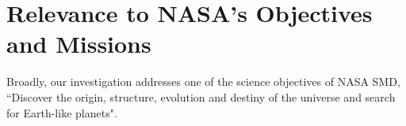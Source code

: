 \documentclass[12pt]{article}
\def\minerva{MINERVA}
\def\hrs{HET/HRS}
\begin{document}

 
\vspace{-3pt}
\section{Relevance to NASA's Objectives and Missions}

Broadly, our investigation addresses one of the science
objectives of NASA SMD, ``Discover the origin, structure, evolution
and destiny of the universe and search for Earth-like planets".
\end{document}
